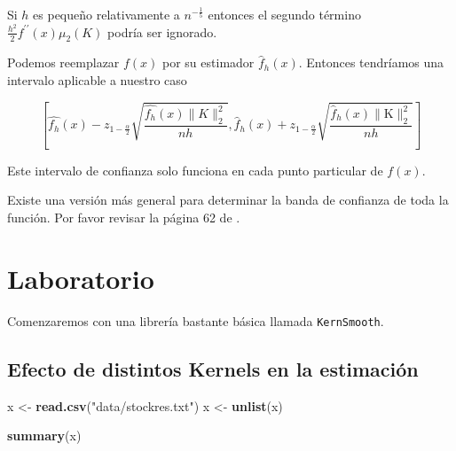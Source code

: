 \documentclass[
  12pt,
]{book}
\newenvironment{Shaded}{\begin{snugshade}}{\end{snugshade}}
\newcommand{\KeywordTok}[1]{\textcolor[rgb]{0.13,0.29,0.53}{\textbf{#1}}}
\newcommand{\NormalTok}[1]{#1}
\newcommand{\StringTok}[1]{\textcolor[rgb]{0.31,0.60,0.02}{#1}}
\theoremstyle{definition}
\theoremstyle{definition}
\theoremstyle{definition}
\theoremstyle{remark}
\let\BeginKnitrBlock\begin \let\EndKnitrBlock\end
\begin{document}
Si \(h\) es pequeño relativamente a \(n^{-\frac{1}{5}}\) entonces el segundo término \(\frac{h^{2}}{2} f^{\prime \prime}(x) \mu_{2}(K)\) podría ser ignorado.

Podemos reemplazar \(f(x)\) por su estimador \(\hat{f}_{h}(x)\). Entonces tendríamos una intervalo aplicable a nuestro caso

\begin{equation*}
\left[\hat{f_{h}}(x)-z_{1-\frac{\alpha}{2}} \sqrt{\frac{\hat{f_{h}}(x)\|K\|_{2}^{2}}{n h}}, \hat{f}_{h}(x)+z_{1-\frac{\alpha}{2}} \sqrt{\frac{\hat{f}_{h}(x)\|\mathrm{K}\|_{2}^{2}}{n h}}\right]
\end{equation*}

\BeginKnitrBlock{remark}
{}Este intervalo de confianza solo funciona en cada punto particular de \(f(x)\).

Existe una versión más general para determinar la banda de confianza de toda la función. Por favor revisar la página 62 de \autocite{Hardle2004}.
\EndKnitrBlock{remark}

\hypertarget{laboratorio}{%
\section{Laboratorio}\label{laboratorio}}

Comenzaremos con una librería bastante básica llamada \texttt{KernSmooth}.

\hypertarget{efecto-de-distintos-kernels-en-la-estimaciuxf3n}{%
\subsection{Efecto de distintos Kernels en la estimación}\label{efecto-de-distintos-kernels-en-la-estimaciuxf3n}}

\begin{Shaded}
\begin{Highlighting}[]
\NormalTok{x <-}\StringTok{ }\KeywordTok{read.csv}\NormalTok{(}\StringTok{"data/stockres.txt"}\NormalTok{)}
\NormalTok{x <-}\StringTok{ }\KeywordTok{unlist}\NormalTok{(x)}
\end{Highlighting}
\end{Shaded}

\begin{Shaded}
\begin{Highlighting}[]
\KeywordTok{summary}\NormalTok{(x)}
\end{Highlighting}
\end{Shaded}
\end{document}
